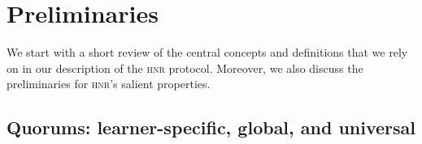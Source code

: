 \documentclass[dvipsnames]{article}
\theoremstyle{definition}
\newcommand{\hnr}{\textsc{hnr}\xspace}
\begin{document}
\section{Preliminaries}
\label{sec:preliminaries}
We start with a short review of the central concepts and definitions 
that we rely on in our description of the \hnr protocol.
Moreover,
we also discuss the preliminaries for \hnr's salient properties. 


\subsection{Quorums: learner-specific, global, and universal}
\label{sec:core-defs}
\end{document}
